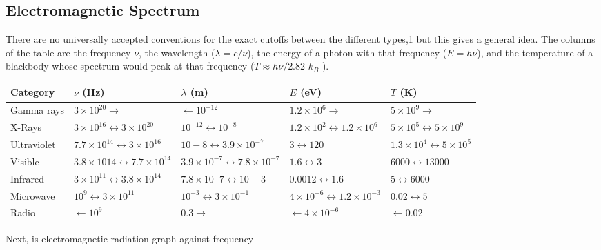 \documentclass[../../../main.tex]{subfiles}
\begin{document}
\subsection{Electromagnetic Spectrum}
There are no universally accepted conventions for the exact cutoffs between the different types,1 but this gives a general idea. The columns of the table are the frequency $\nu$, the wavelength ($\lambda = c/\nu$), the energy of a photon with that frequency ($E = h \nu$), and the temperature of a blackbody whose spectrum would peak at that frequency ($T \approx h \nu /2.82$ $k_B$ ).
\begin{center}
    \begin{longtable}{| p{} | p{} | p{} | p{} | p{} |}
        \hline
        Category&$\nu$ (Hz)&$\lambda$ (m)&$E$ (eV)&$T$ (K)\\
        \hline\hline
        Gamma rays&$3 \times 10^{20} \rightarrow $&$\leftarrow 10^{-12}$&$1.2 \times 10^6 \rightarrow $&$5 \times 10^9\rightarrow$ \\\hline
        X-Rays&$3 \times 10^{16} \leftrightarrow 3 \times 10^{20}$&$10^{-12} \leftrightarrow 10^{-8}$&$1.2 \times 10^2 \leftrightarrow 1.2 \times 10^6$&$5 \times 10^5 \leftrightarrow 5 \times 10^9$\\\hline
        Ultraviolet&$7.7 \times 10^{14} \leftrightarrow 3 \times 10^{16}$&$10-8 \leftrightarrow 3.9 \times 10^{-7}$&$3 \leftrightarrow 120$&$1.3 \times 10^4 \leftrightarrow 5 \times 10^5$\\\hline
        Visible&$3.8 \times 10 14 \leftrightarrow 7.7 \times 10^{14}$&$3.9 \times 10^{-7} \leftrightarrow 7.8 \times 10^{-7}$&$1.6 \leftrightarrow 3$&$6000 \leftrightarrow 13000$\\\hline
        Infrared&$3 \times 10^{11} \leftrightarrow 3.8 \times 10 ^{14}$&$7.8 \times 10^{-}7 \leftrightarrow 10-3$&$0.0012 \leftrightarrow 1.6$&$5 \leftrightarrow 6000$\\\hline
        Microwave&$10^9 \leftrightarrow 3 \times 10^{11}$&$10^{-3} \leftrightarrow 3 \times 10^{-1}$&$4 \times 10^{-6} \leftrightarrow 1.2 \times 10^{-3}$&$0.02 \leftrightarrow 5$\\\hline
        Radio&$\leftarrow 10^9$&$0.3 \rightarrow$&$\leftarrow 4 \times 10^{-6}$&$\leftarrow 0.02$\\\hline
    \end{longtable}
\end{center}

Next, is electromagnetic radiation graph against frequency
\begin{figure}[h]
    \centering
\end{figure}
\end{document}
